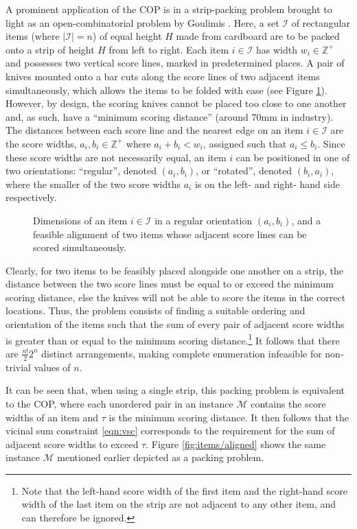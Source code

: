 \documentclass[runningheads]{llncs}
\begin{document}
A prominent application of the COP is in a strip-packing problem brought to light as an open-combinatorial problem by Goulimis \cite{goulimis2004}. Here, a set $\mathcal{I}$ of rectangular items (where $|\mathcal{I}| = n$) of equal height $H$ made from cardboard are to be packed onto a strip of height $H$ from left to right. Each item $i \in \mathcal{I}$ has width $w_i \in \mathbb{Z}^{+}$ and possesses two vertical score lines, marked in predetermined places. A pair of knives mounted onto a bar cuts along the score lines of two adjacent items simultaneously, which allows the items to be folded with ease (see Figure \ref{fig:itemsknife}). However, by design, the scoring knives cannot be placed too close to one another and, as such, have a ``minimum scoring distance'' (around 70mm in industry). The distances between each score line and the nearest edge on an item $i \in \mathcal{I}$ are the score widths, $a_i, b_i \in \mathbb{Z}^{+}$ where $a_i + b_i < w_i$, assigned such that $a_i \leq b_i$. Since these score widths are not necessarily equal, an item $i$ can be positioned in one of two orientations: ``regular'', denoted $(a_i, b_i)$, or ``rotated'', denoted $(b_i, a_i)$, where the smaller of the two score widths $a_i$ is on the left- and right- hand side respectively. 
\begin{figure}[H]	
	\centering
	
	\caption{Dimensions of an item $i \in \mathcal{I}$ in a regular orientation $(a_i, b_i)$, and a feasible alignment of two items whose adjacent score lines can be scored simultaneously.}	
	\label{fig:itemsknife}
\end{figure}
\noindent Clearly, for two items to be feasibly placed alongside one another on a strip, the distance between the two score lines must be equal to or exceed the minimum scoring distance, else the knives will not be able to score the items in the correct locations. Thus, the problem consists of finding a suitable ordering and orientation of the items such that the sum of every pair of adjacent score widths is greater than or equal to the minimum scoring distance.\footnote{Note that the left-hand score width of the first item and the right-hand score width of the last item on the strip are not adjacent to any other item, and can therefore be ignored.} It follows that there are $\frac{n!}{2}2^n$ distinct arrangements, making complete enumeration infeasible for non-trivial values of $n$.

It can be seen that, when using a single strip, this packing problem is equivalent to the COP, where each unordered pair in an instance $\mathcal{M}$ contains the score widths of an item and $\tau$ is the minimum scoring distance. It then follows that the vicinal sum constraint \eqref{eqn:vsc} corresponds to the requirement for the sum of adjacent score widths to exceed $\tau$. Figure \ref{fig:items/aligned} shows the same instance $\mathcal{M}$ mentioned earlier depicted as a packing problem. 
\end{document}
